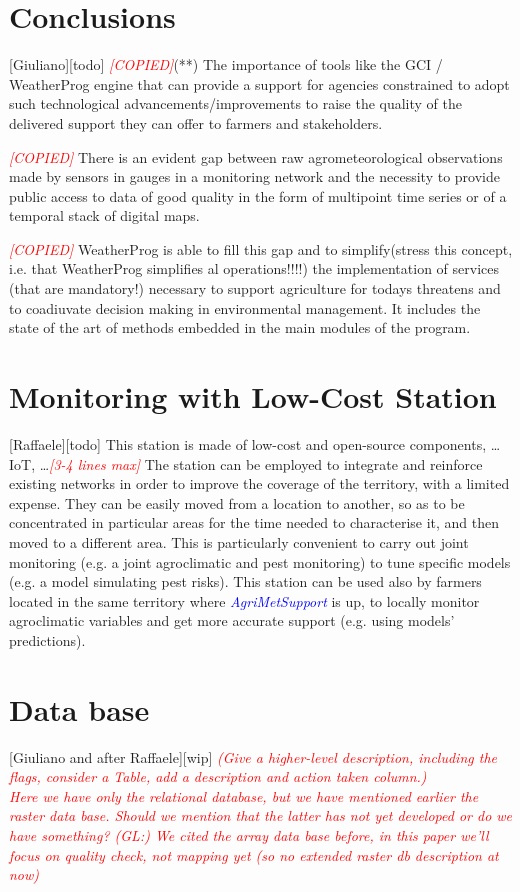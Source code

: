 \documentclass[authoryear,preprint,review,12pt]{elsarticle}
\newcommand{\note}[1]{\emph{\textcolor{red}{#1}}}
\newcommand{\update}[1]{\emph{\textcolor{blue}{#1}}}
\newcommand{\gci}{\update{AgriMetSupport}\xspace}
\begin{document}
\section{Conclusions}[Giuliano][todo]
\note{[COPIED]}(**) The importance of tools like the GCI / WeatherProg engine that can provide a support for agencies constrained to adopt such technological advancements/improvements to raise the quality of the delivered support they can offer to farmers and stakeholders.

\note{[COPIED]} There is an evident gap between raw agrometeorological observations made by sensors in gauges in a monitoring network and the necessity to provide public access to data of good quality in the form of multipoint time series or of a temporal stack of digital maps.

\note{[COPIED]} WeatherProg is able to fill this gap and to simplify(stress this concept, i.e. that WeatherProg simplifies al operations!!!!) the implementation of services (that are mandatory!) necessary to support agriculture for todays threatens and to coadiuvate decision making in environmental management. It includes the state of the art of methods embedded in the main modules of the program.

\appendix

\section{Monitoring with Low-Cost Station}[Raffaele][todo]
This station is made of low-cost and open-source components, \ldots IoT, \dots \note{[3-4 lines max]} The station can be employed to integrate and reinforce existing networks in order to improve the coverage of the territory, with a limited expense. They can be easily moved from a location to another, so as to be concentrated in particular areas for the time needed to characterise it, and then moved to a different area. This is particularly convenient to carry out joint monitoring (e.g. a  joint agroclimatic and pest monitoring) to tune specific models (e.g. a model simulating pest risks). This station can be used also by farmers located in the same territory where \gci is up, to locally monitor agroclimatic variables and get more accurate support (e.g. using models' predictions).

\section{Data base}[Giuliano and after Raffaele][wip]
\note{(Give a higher-level description, including the flags, consider a Table, add a description and action taken column.)}\\
\note{Here we have only the relational database, but we have mentioned earlier the raster data base. Should we mention that the latter has not yet developed or do we have something? (GL:) We cited the array data base before, in this paper we'll focus on quality check, not mapping yet (so no extended raster db description at now)}
\end{document}
